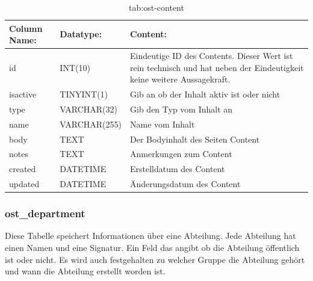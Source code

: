 \begin{table}[h]
	\begin{tabular}{|p{3.5cm}|p{4cm}|p{7.2cm}|}
		\hline
		\textbf{Column Name:} & \textbf{Datatype:} & \textbf{Content:}\\
		\hline
		id & INT(10) & Eindeutige ID des Contents. Dieser Wert ist rein technisch und hat  neben der Eindeutigkeit keine weitere 
		Aussagekraft.\\
		\hline
		isactive & TINYINT(1) & Gib an ob der Inhalt aktiv ist oder nicht\\
		\hline
		type & VARCHAR(32) & Gib den Typ vom Inhalt an\\
		\hline
		name & VARCHAR(255) & Name vom Inhalt\\
		\hline
		body & TEXT & Der Bodyinhalt des Seiten Content\\
		\hline
		notes & TEXT & Anmerkungen zum Content\\
		\hline
		created & DATETIME & Erstelldatum des Content\\
		\hline
		updated & DATETIME & Änderungsdatum des Content\\
		\hline
	\end{tabular}
	\caption{tab:ost-content}
\end{table}
\label{tab:ost_content}

\subsubsection{ost\_department}

Diese Tabelle speichert Informationen über eine Abteilung. Jede Abteilung hat einen Namen und eine Signatur. Ein Feld das angibt ob die Abteilung öffentlich ist oder nicht. Es wird auch festgehalten zu welcher Gruppe die Abteilung gehört und wann die Abteilung erstellt worden ist.

